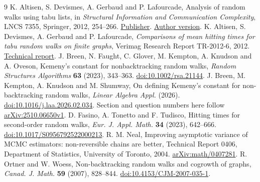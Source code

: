 \documentclass[11pt]{article}
\begin{document}
\begin{thebibliography}{9}
 K. Altisen, S. Devismes, A. Gerbaud and P. Lafourcade,
Analysis of random walks using tabu lists, in \emph{Structural Information
and Communication Complexity}, LNCS 7355, Springer, 2012, 254--266.
\href{https://doi.org/10.1007/978-3-642-31104-8_22}{Publisher}.
\href{https://www-verimag.imag.fr/PUBLIS/uploads/cizib1712.pdf}{Author version}.
 K. Altisen, S. Devismes, A. Gerbaud and P. Lafourcade,
\emph{Comparisons of mean hitting times for tabu random walks on finite
graphs}, Verimag Research Report TR-2012-6, 2012.
\href{https://www-verimag.imag.fr/TR/TR-2012-6.pdf}{Technical report}.
 J. Breen, N. Faught, C. Glover, M. Kempton, A. Knudson and
A. Oveson, Kemeny's constant for nonbacktracking random walks,
\emph{Random Structures Algorithms} \textbf{63} (2023), 343--363.
\href{https://doi.org/10.1002/rsa.21144}{doi:10.1002/rsa.21144}.
 J. Breen, M. Kempton, A. Knudson and M. Shumway,
On defining Kemeny's constant for non-backtracking random walks,
\emph{Linear Algebra Appl.} (2026).
\href{https://doi.org/10.1016/j.laa.2026.02.034}{doi:10.1016/j.laa.2026.02.034}.
Section and question numbers here follow
\href{https://arxiv.org/html/2510.06650v1}{arXiv:2510.06650v1}.
 D. Fasino, A. Tonetto and F. Tudisco, Hitting times for
second-order random walks, \emph{Eur. J. Appl. Math.} \textbf{34}
(2023), 642--666.
\href{https://doi.org/10.1017/S0956792522000213}{doi:10.1017/S0956792522000213}.
 R. M. Neal, Improving asymptotic variance of MCMC estimators:
non-reversible chains are better, Technical Report 0406, Department of
Statistics, University of Toronto, 2004.
\href{https://arxiv.org/abs/math/0407281}{arXiv:math/0407281}.
 R. Ortner and W. Woess, Non-backtracking random walks and
cogrowth of graphs, \emph{Canad. J. Math.} \textbf{59} (2007), 828--844.
\href{https://doi.org/10.4153/CJM-2007-035-1}{doi:10.4153/CJM-2007-035-1}.
\end{thebibliography}
\end{document}
